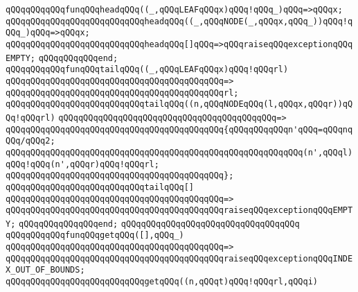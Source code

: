 \verb|qQQqqQQqqQQqfunqQQqheadqQQq((_,qQQqLEAFqQQqx)qQQq!qQQq_)qQQq=>qQQqx;|\newline
\verb|qQQqqQQqqQQqqQQqqQQqqQQqqQQqheadqQQq((_,qQQqNODE(_,qQQqx,qQQq_))qQQq!qQQq_)qQQq=>qQQqx;|\newline
\verb|qQQqqQQqqQQqqQQqqQQqqQQqqQQqheadqQQq[]qQQq=>qQQqraiseqQQqexceptionqQQqEMPTY;|\newline
\verb|qQQqqQQqqQQqend;|\newline
\newline
\verb|qQQqqQQqqQQqfunqQQqtailqQQq((_,qQQqLEAFqQQqx)qQQq!qQQqrl)|\newline
\verb|qQQqqQQqqQQqqQQqqQQqqQQqqQQqqQQqqQQqqQQqqQQq=>|\newline
\verb|qQQqqQQqqQQqqQQqqQQqqQQqqQQqqQQqqQQqqQQqqQQqrl;|\newline
\newline
\verb|qQQqqQQqqQQqqQQqqQQqqQQqqQQqtailqQQq((n,qQQqNODEqQQq(l,qQQqx,qQQqr))qQQq!qQQqrl)|\newline
\verb|qQQqqQQqqQQqqQQqqQQqqQQqqQQqqQQqqQQqqQQqqQQq=>|\newline
\verb|qQQqqQQqqQQqqQQqqQQqqQQqqQQqqQQqqQQqqQQqqQQq{qQQqqQQqqQQqn'qQQq=qQQqnqQQq/qQQq2;|\newline
\newline
\verb|qQQqqQQqqQQqqQQqqQQqqQQqqQQqqQQqqQQqqQQqqQQqqQQqqQQqqQQqqQQq(n',qQQql)qQQq!qQQq(n',qQQqr)qQQq!qQQqrl;|\newline
\verb|qQQqqQQqqQQqqQQqqQQqqQQqqQQqqQQqqQQqqQQqqQQq};|\newline
\newline
\verb|qQQqqQQqqQQqqQQqqQQqqQQqqQQqtailqQQq[]|\newline
\verb|qQQqqQQqqQQqqQQqqQQqqQQqqQQqqQQqqQQqqQQqqQQq=>|\newline
\verb|qQQqqQQqqQQqqQQqqQQqqQQqqQQqqQQqqQQqqQQqqQQqraiseqQQqexceptionqQQqEMPTY;|\newline
\verb|qQQqqQQqqQQqqQQqend;|\newline
\verb|qQQqqQQqqQQqqQQqqQQqqQQqqQQqqQQqqQQq|\newline
\verb|qQQqqQQqqQQqfunqQQqgetqQQq([],qQQq_)|\newline
\verb|qQQqqQQqqQQqqQQqqQQqqQQqqQQqqQQqqQQqqQQqqQQq=>|\newline
\verb|qQQqqQQqqQQqqQQqqQQqqQQqqQQqqQQqqQQqqQQqqQQqraiseqQQqexceptionqQQqINDEX_OUT_OF_BOUNDS;|\newline
\newline
\verb|qQQqqQQqqQQqqQQqqQQqqQQqqQQqgetqQQq((n,qQQqt)qQQq!qQQqrl,qQQqi)|\newline
